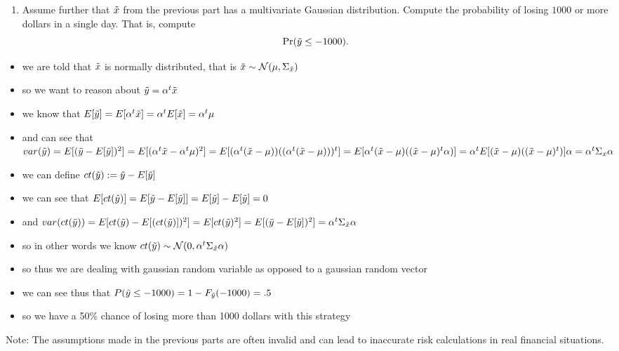 \documentclass[12pt,twoside]{article}
\begin{document}
\begin{enumerate}
\begin{enumerate}
\begin{itemize}
  \end{itemize}
  \item Assume further that $\tilde{  x }$ from the previous part has a
    multivariate Gaussian distribution.  Compute the probability
    of losing $1000$ or more dollars in a single day.  That is,
    compute
    $$\Pr(\tilde{  y } \leq -1000).$$
  \end{enumerate}
\begin{itemize}
 \color{blue}
  \item we are told that $\Tilde{x}$ is normally distributed, that is $\Tilde{x}\sim \mathcal{N}(\mu, \Sigma_{\Tilde{x}})$ 
  \item so we want to reason about $\Tilde{y}=\alpha^{t}\Tilde{x}$
  \item we know that $E[\tilde{y}]=E[\alpha^{t}\Tilde{x}]=\alpha^{t} E[\Tilde{x}]=\alpha^{t} \mu$
  \item and can see that $var(\Tilde{y})=E[(\Tilde{y}-E[\Tilde{y}])^2]=E[(\alpha^{t} \Tilde{x}-\alpha^{t}\mu)^2]=E[(\alpha^{t}( \Tilde{x}-\mu))((\alpha^{t}( \Tilde{x}-\mu)))^t]=E[\alpha^{t}(\Tilde{x}-\mu)((\Tilde{x}-\mu)^{t}\alpha)]=\alpha^{t}E[(\Tilde{x}-\mu)((\Tilde{x}-\mu)^{t})]\alpha=\alpha^{t}\Sigma_{x}\alpha$
 
  \item we can define $ct(\Tilde{y}):=\Tilde{y}-E[\tilde{y}]$
  \item we can see that $E[ct(\Tilde{y})]=E[\Tilde{y}-E[\Tilde{y}]]=E[\Tilde{y}]-E[\Tilde{y}]=0$
  \item and $var(ct(\Tilde{y}))=E[ct(\Tilde{y})-E[(ct(\Tilde{y})])^2]=E[ct(\Tilde{y})^2]=E[(\Tilde{y}-E[\Tilde{y}])^2]=\alpha^{t}\Sigma_{\Tilde{x}}\alpha$
  \item so in other words we know $ct(\Tilde{y})\sim\mathcal{N}(0,\alpha^{t}\Sigma_{\Tilde{x}}\alpha)$
  \item so thus we are dealing with gaussian random variable as opposed to a gaussian random vector
  \item we can see thus that $P(\Tilde{y}\leq -1000)=1-F_{\Tilde{y}}(-1000)=.5$
  \item so we have a 50\%  chance of losing more than 1000 dollars with this strategy 
\end{itemize}


  Note: The assumptions made in the previous parts are often
  invalid and can lead to inaccurate risk calculations in real
  financial situations. 

\end{enumerate}
\end{document}
